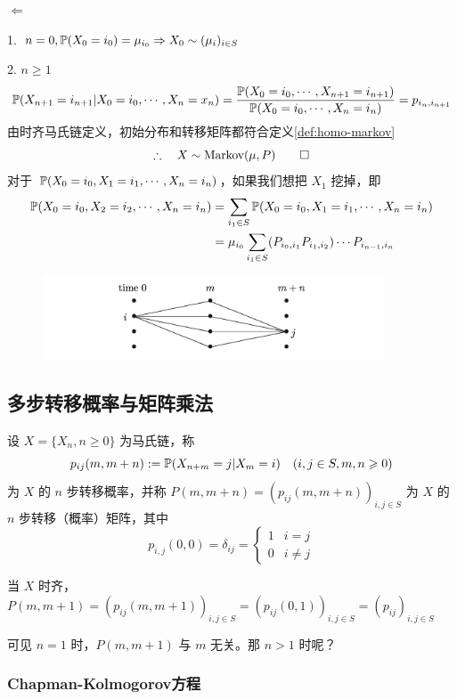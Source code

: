$\Leftarrow$ 

1. $n=0, \mathbb{P}(X_0=i_0)=\mu_{i_0}\Rightarrow X_0\sim (\mu_i)_{i\in S}$

2. $n\geq 1$
\[
\mathbb{P}(X_{n+1}=i_{n+1}|X_0=i_0,\cdots,X_n=x_n)=\frac{\mathbb{P}(X_0=i_0,\cdots,X_{n+1}=i_{n+1})}{\mathbb{P}(X_0=i_0,\cdots, X_n=i_n)}=p_{i_n,i_{n+1}}
\]
由时齐马氏链定义，初始分布和转移矩阵都符合定义\ref{def:homo-markov}
\[
\therefore \quad X\sim \text{Markov}(\mu,P)\qed
\]
对于 $\mathbb{P}(X_0=i_0,X_1=i_1,\cdots,X_{n}=i_{n})$，如果我们想把 $X_1$ 挖掉，即
\[
\begin{aligned}
    \mathbb{P}(X_0=i_0,X_2=i_2,\cdots,X_{n}=i_{n})&=\sum_{i_1\in S}\mathbb{P}(X_0=i_0,X_1=i_1,\cdots,X_{n}=i_{n})\\
    &=\mu_{i_0}\sum_{i_1\in S}(P_{i_0,i_1}P_{i_1,i_2})\cdots P_{i_{n-1},i_n}
\end{aligned}
\]

\begin{figure}[H]
    \centering
    \includegraphics[width=0.9\textwidth]{figures/split_steps.png}
\end{figure}

\subsection{多步转移概率与矩阵乘法}

\begin{definition}
    设 $X=\{X_n,n\geq 0\}$ 为马氏链，称
    \[
    p_{ij}(m,m+n):=\mathbb{P}(X_{n+m}=j|X_m=i)\quad (i,j\in S, m,n\geqslant 0)
    \]
    为 $X$ 的 $n$ 步转移概率，并称 $P(m,m+n)=(p_{ij}(m,m+n))_{i,j\in S}$ 为 $X$ 的 $n$ 步转移（概率）矩阵，其中
    \[
    p_{i,j}(0,0)=\delta_{ij}=\begin{cases}
        1 & i=j\\
        0 & i\neq j
    \end{cases}
    \]
\end{definition}

当 $X$ 时齐，$P(m,m+1)=(p_{ij}(m,m+1))_{i,j\in S}=(p_{ij}(0,1))_{i,j\in S}=(p_{ij})_{i,j\in S}$

可见 $n=1$ 时，$P(m,m+1)$ 与 $m$ 无关。那 $n>1$ 时呢？

\subsubsection{Chapman-Kolmogorov方程}

